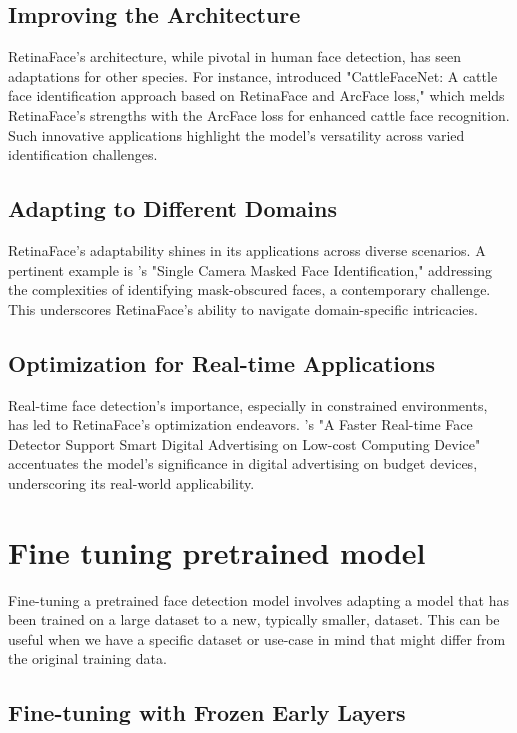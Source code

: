 \documentclass{article}
\begin{document}
\subsection{Improving the Architecture}
RetinaFace's architecture, while pivotal in human face detection, has seen adaptations for other species. For instance, \cite{xu2022cattlefacenet} introduced "CattleFaceNet: A cattle face identification approach based on RetinaFace and ArcFace loss," which melds RetinaFace's strengths with the ArcFace loss for enhanced cattle face recognition. Such innovative applications highlight the model's versatility across varied identification challenges.

\subsection{Adapting to Different Domains}
RetinaFace's adaptability shines in its applications across diverse scenarios. A pertinent example is \cite{aswal2020single}'s "Single Camera Masked Face Identification," addressing the complexities of identifying mask-obscured faces, a contemporary challenge. This underscores RetinaFace's ability to navigate domain-specific intricacies.

\subsection{Optimization for Real-time Applications}
Real-time face detection's importance, especially in constrained environments, has led to RetinaFace's optimization endeavors. \cite{putro2022faster}'s "A Faster Real-time Face Detector Support Smart Digital Advertising on Low-cost Computing Device" accentuates the model's significance in digital advertising on budget devices, underscoring its real-world applicability.

\section{Fine tuning pretrained model}

Fine-tuning a pretrained face detection model involves adapting a model that has been trained on a large dataset to a new, typically smaller, dataset. 
This can be useful when we have a specific dataset or use-case in mind that might differ from the original training data. 

\subsection{Fine-tuning with Frozen Early Layers}
\end{document}
